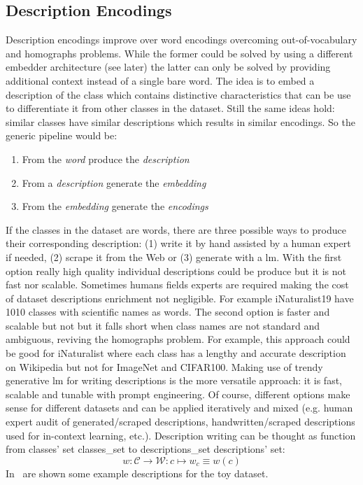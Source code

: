 \subsection{Description Encodings}
\label{subsec:description-encodings}

Description encodings improve over word encodings overcoming out-of-vocabulary
and homographs problems. While the former could be solved by using a different
embedder architecture (see later) the latter can only be solved by providing
additional context instead of a single bare word. The idea is to embed a
description of the class which contains distinctive characteristics that can be
use to differentiate it from other classes in the dataset. Still the same ideas
hold: similar classes have similar descriptions which results in similar
encodings. So the generic pipeline would be:
\begin{enumerate}
  \item From the \emph{word} produce the \emph{description}
  \item From a \emph{description} generate the \emph{embedding}
  \item From the \emph{embedding} generate the \emph{encodings}
\end{enumerate}

If the classes in the dataset are words, there are three possible ways to
produce their corresponding description: (1) write it by hand assisted by a
human expert if needed, (2) scrape it from the Web or (3) generate with a
\acrshort{lm}. With the first option really high quality individual descriptions
could be produce but it is not fast nor scalable. Sometimes humans fields
experts are required making the cost of dataset descriptions enrichment not
negligible. For example iNaturalist19 have 1010 classes with scientific names as
words. The second option is faster and scalable but not but it falls short when
class names are not standard and ambiguous, reviving the homographs problem. For
example, this approach could be good for iNaturalist where each class has a
lengthy and accurate description on Wikipedia but not for ImageNet and CIFAR100.
Making use of trendy generative \acrshort{lm} for writing descriptions is the
more versatile approach: it is fast, scalable and tunable with prompt
engineering. Of course, different options make sense for different datasets and
can be applied iteratively and mixed (e.g. human expert audit of
generated/scraped descriptions, handwritten/scraped descriptions used for
in-context learning, etc.). Description writing can be thought as function from
classes' set \gls{classes_set} to \gls{descriptions_set} descriptions' set:
\begin{equation}
  w : \mathcal{C} \to \mathcal{W}:
  c \mapsto w_c \equiv w(c)
  \label{eq:desc-writing}
\end{equation}
In~ are shown some example descriptions for the toy
dataset.


